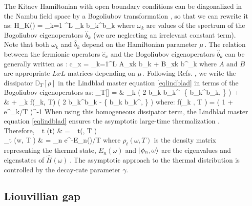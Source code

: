 The Kitaev Hamiltonian with open boundary conditions can be diagonalized 
in the Nambu field space by a Bogoliubov transformation \cite{dr2021self, PF70, bla86},
so that we can rewrite it as:
	\hat H_K(\omega)  = \sum_{k=1} ^L \omega_k \hat b_k^\dagger \hat b_k  \cm
\ea
where $\omega_k$ are values of the spectrum of the Bogoliubov eigenoperators $\hat b_k$
(we are neglecting an irrelevant constant term). Note that both $\omega_k$ and 
$\hat b_k$ depend on the Hamiltonian parameter $\mu\,$. The relation between the
fermionic operators $\hat c_x$ and the Bogoliubov eigenoperators 
$\hat b_k$ can be generally written as \cite{dr2021self, PF70, bla86}:
	\hat c_x = \sum_{k=1}^L A_{xk} \hat b_k + B_{xk} \hat b^\dagger _k \cm
\ea
where $A$ and $B$ are appropriate $LxL$ matrices depending on $\mu\,$.
Following Refs. \cite{dr2021self, CPR-2022-otto_engine}, we write the dissipator
$\mathbb{D}_T[\rho]$ in the Lindblad master equation \eqref{eqlindblad} in terms of
the Bogoliubov eigenoperators as:
	_T[\rho] = & \gamma \sum_k  
		\bigl( 2 \hat b_k \rho \hat b_k^\dagger -
			\{ \hat b_k^\dagger \hat b_k, \rho \} \bigl) + \\
		& + \gamma \sum _k f(\omega_k, T) \bigl( 2 \hat b_k^\dagger \rho \hat b_k -
                        \{ \hat b_k \hat b_k^\dagger, \rho \} \bigl) \cm
\ea
where:
	f(\omega_k , T ) = \bigl( 1 + e^{\omega_k/T} \bigl)^{-1} \pt
\ee
When using this homogeneous dissipator term, the Lindblad master equation 
\eqref{eqlindblad} ensures the asymptotic large-time thermalization \cite{dr2021self}.
Therefore,
	\lim_{t \to \infty} \rho(t) & = \rho_t(\omega, T ) \cm \\
	\rho_t (w, T ) &  = \sum_n e^{-E_n(\omega)/T}  
					 \cm
\ea
where $\rho_t(\omega,T)$ is the density matrix representing the
thermal state, $E_n (\omega)$ and $\ket{\phi_n, \omega}$ are the eigenvalues
and eigenstates of $\hat H(\omega)\,$. The asymptotic approach to
the thermal distribution is controlled by the decay-rate parameter $\gamma$.

\subsection{Liouvillian gap}

